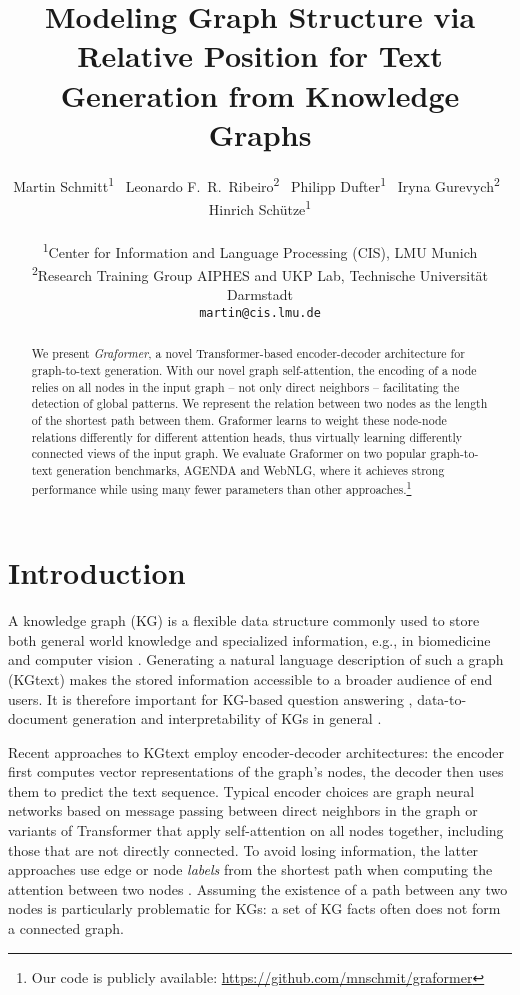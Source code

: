 \documentclass[11pt]{article}
\title{Modeling Graph Structure via Relative Position for Text Generation from Knowledge Graphs}
\author{Martin Schmitt\textsuperscript{1}
	\, Leonardo F.\ R.\ Ribeiro\textsuperscript{2}
	\, Philipp Dufter\textsuperscript{1}
	\, Iryna Gurevych\textsuperscript{2}
	\, Hinrich Sch\"{u}tze\textsuperscript{1}\\\\
\textsuperscript{1}Center for Information and Language Processing (CIS), LMU Munich\\
	\textsuperscript{2}Research Training Group AIPHES and UKP Lab, Technische Universität Darmstadt\\
	{\tt martin@cis.lmu.de}
}
\date{}
\newcommand{\gtt}{KGtext}
\begin{document}
\maketitle
\begin{abstract}
We present \emph{Graformer}, a novel Transformer-based encoder-decoder architecture for graph-to-text generation.
With our novel graph self-attention,
the encoding of a node relies on all nodes in the input graph
-- not only direct neighbors --
facilitating the detection of global patterns.
We represent
the relation between two nodes as
the length of the shortest path between them.
Graformer learns to weight these node-node relations
differently for different attention heads,
thus virtually learning differently connected views of the input graph.
We evaluate Graformer on two popular graph-to-text generation benchmarks,
AGENDA and WebNLG,
where it achieves strong performance
while using many fewer parameters
than other approaches.\footnote{Our code is publicly available: \url{https://github.com/mnschmit/graformer}}
\end{abstract}

\section{Introduction}
A knowledge graph (KG) is a flexible data structure
commonly used to store both general world knowledge \citep{auer08}
and specialized information, e.g., in biomedicine
\citep{wishart18}
and computer vision
\citep{visualgenome}.
Generating a natural language description of such a graph (\gtt{})
makes the stored information accessible to a broader audience of end users.
It is therefore important for KG-based question answering \citep{bhowmik-de-melo-2018-generating},
data-to-document generation \citep{moryossef-etal-2019-step,koncel-kedziorski-etal-2019-text}
and interpretability of KGs in general \citep{schmitt20}.

Recent approaches to \gtt{} employ encoder-decoder architectures:
the encoder first computes vector representations of the
graph's nodes, the decoder 
then uses them to predict the text sequence.
Typical encoder choices are graph neural networks
based on message passing between direct neighbors in the graph \citep{kipf17,velickovic18}
or variants of Transformer \citep{vaswani17}
that apply self-attention on all nodes together,
including those that
are not directly connected.
To avoid losing information,
the latter approaches use edge or node \textit{labels} from the
shortest path
when computing the attention between two nodes \citep{zhu-etal-2019-modeling,cai20}.
Assuming the existence of a path between any two nodes is
particularly problematic for KGs:
a set of KG facts often does not form a connected graph.
\end{document}
